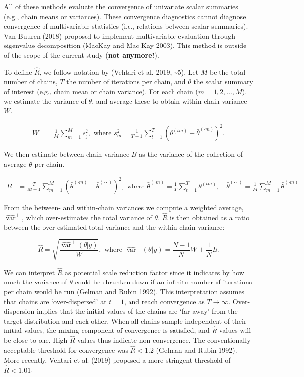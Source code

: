 \documentclass[
  Royal, times, sageapa]{sagej}
\begin{document}
All of these methods evaluate the convergence of univariate scalar
summaries (e.g., chain means or variances). These convergence
diagnostics cannot diagnose convergence of multivariable statistics
(i.e., relations between scalar summaries). Van Buuren (2018) proposed
to implement multivariable evaluation through eigenvalue decomposition
(MacKay and Mac Kay 2003). This method is outside of the scope of the
current study (\textbf{not anymore!}).

To define \(\widehat{R}\), we follow notation by (Vehtari et al. 2019,
\textasciitilde5). Let \(M\) be the total number of chains, \(T\) the
number of iterations per chain, and \(\theta\) the scalar summary of
interest (e.g., chain mean or chain variance). For each chain
(\(m = 1, 2, \dots, M\)), we estimate the variance of \(\theta\), and
average these to obtain within-chain variance \(W\).

\begin{align*}
W&=\frac{1}{M} \sum_{m=1}^{M} s_{j}^{2},  \text { where } s_{m}^{2}=\frac{1}{T-1} \sum_{t=1}^{T}\left(\theta^{(t m)}-\bar{\theta}^{(\cdot m)}\right)^{2}. 
\end{align*}

We then estimate between-chain variance \(B\) as the variance of the
collection of average \(\theta\) per chain.

\begin{align*}
B&=\frac{T}{M-1} \sum_{m=1}^{M}\left(\bar{\theta}^{(\cdot m)}-\bar{\theta}^{(\cdot \cdot)}\right)^{2}, \text { where } \bar{\theta}^{(\cdot m)}=\frac{1}{T} \sum_{t=1}^{T} \theta^{(t m)}, \quad \bar{\theta}^{(\cdot \cdot)}=\frac{1}{M} \sum_{m=1}^{M} \bar{\theta}^{(\cdot m)}. 
\end{align*}

From the between- and within-chain variances we compute a weighted
average, \(\widehat{\operatorname{var}}^{+}\), which over-estimates the
total variance of \(\theta\). \(\widehat{R}\) is then obtained as a
ratio between the over-estimated total variance and the within-chain
variance:

\begin{equation*}
\widehat{R}=\sqrt{\frac{\widehat{\operatorname{var}}^{+}(\theta | y)}{W}},
\text{ where } \widehat{\operatorname{var}}^{+}(\theta | y)=\frac{N-1}{N} W+\frac{1}{N} B.
\end{equation*}

We can interpret \(\widehat{R}\) as potential scale reduction factor
since it indicates by how much the variance of \(\theta\) could be
shrunken down if an infinite number of iterations per chain would be run
(Gelman and Rubin 1992). This interpretation assumes that chains are
`over-dispersed' at \(t=1\), and reach convergence as \(T \to \infty\).
Over-dispersion implies that the initial values of the chains are `far
away' from the target distribution and each other. When all chains
sample independent of their initial values, the mixing component of
convergence is satisfied, and \(\widehat{R}\)-values will be close to
one. High \(\widehat{R}\)-values thus indicate non-convergence. The
conventionally acceptable threshold for convergence was
\(\widehat{R} < 1.2\) (Gelman and Rubin 1992). More recently, Vehtari et
al. (2019) proposed a more stringent threshold of
\(\widehat{R} < 1.01\).
\end{document}
